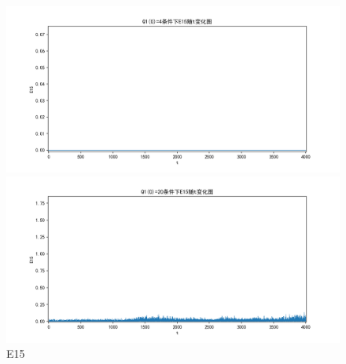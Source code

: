 \documentclass[10pt, a4paper]{article}
\begin{document}
    \begin{figure}[H]
        \begin{minipage}[t]{0.49\textwidth}
            \centering
            \includegraphics[width=\textwidth]{./q5_pics/cmp/E15.png}
        \end{minipage}
        \begin{minipage}[t]{0.49\textwidth}
            \centering
            \includegraphics[width=\textwidth]{./q5_pics/exp/E15.png}
        \end{minipage}
        \caption{E15}\label{fig:E15 in q5}
    \end{figure}
\end{document}
